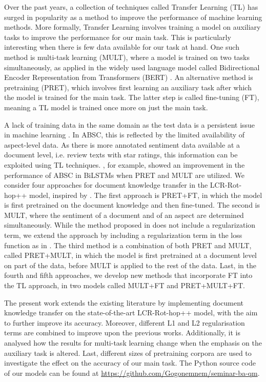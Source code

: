 Over the past years, a collection of techniques called Transfer Learning (TL) has surged in popularity as a method to improve the performance of machine learning methods. More formally, Transfer Learning involves training a model on auxiliary tasks to improve the performance for our main task. This is particularly interesting when there is few data available for our task at hand. One such method is multi-task learning (MULT), where a model is trained on two tasks simultaneously, as applied in the widely used language model called Bidirectional Encoder Representation from Transformers (BERT) \cite{Devlin2019}. An alternative method is pretraining (PRET), which involves first learning an auxiliary task after which the model is trained for the main task. The latter step is called fine-tuning (FT), meaning a TL model is trained once more on just the main task.

A lack of training data in the same domain as the test data is a persistent issue in machine learning \cite{pan2010}. In ABSC, this is reflected by the limited availability of aspect-level data. As there is more annotated sentiment data available at a document level, i.e. review texts with star ratings, this information can be exploited using TL techniques. \cite{He2018}, for example, showed an improvement in the performance of ABSC in BiLSTMs when PRET and MULT are utilized. We consider four approaches for document knowledge transfer in the LCR-Rot-hop++ model, inspired by \cite{He2018}. The first approach is PRET+FT, in which the model is first pretrained on the document knowledge and then fine-tuned. The second is MULT, where the sentiment of a document and of an aspect are determined simultaneously. While the method proposed in \cite{He2018} does not include a regularization term, we extend the approach by including a regularization term in the loss function as in \cite{Wallaart2019}. The third method is a combination of both PRET and MULT, called PRET+MULT, in which the model is first pretrained at a document level on part of the data, before MULT is applied to the rest of the data. Last, in the fourth and fifth approaches, we develop new methods that incorporate FT into the TL approach, in two models called MULT+FT and PRET+MULT+FT. 

The present work extends the existing literature by implementing document knowledge transfer on the state-of-the-art LCR-Rot-hop++ model, with the aim to further improve its accuracy. Moreover, different L1 and L2 regularisation terms are combined to improve upon the previous works. Additionally, it is analysed how the results for multi-task learning change when the emphasis on the auxiliary task is altered. Last, different sizes of pretraining corpora are used to investigate the effect on the accuracy of our main task. The Python source code of our models can be found at \url{https://github.com/Gogonemnem/seminar-ba-qm}.


